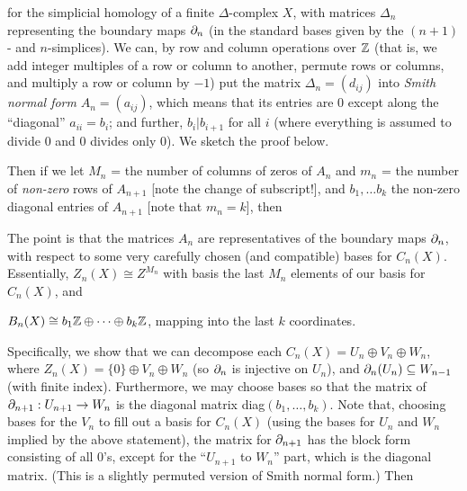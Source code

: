 \ssk

for the simplicial homology of a finite $\Delta$-complex $X$,
with matrices $\Delta_n$ representing the boundary maps $\partial_n$
(in the standard bases given by the $(n+1)$- and $n$-simplices).
We can, by row and column operations over ${\Bbb Z}$ (that is, we
add integer multiples of a row or column to another, permute
rows  or columns, and multiply a row or column by $-1$) put the
matrix $\Delta_n=(d_{ij})$ into {\it Smith normal form} 
$A_n=(a_{ij})$, which means that
its entries are $0$ except along the ``diagonal'' $a_{ii}=b_i$; and
further, $b_i|b_{i+1}$ for all $i$ (where everything is 
assumed to divide $0$ and $0$ divides only $0$). We sketch 
the proof below. 

\msk

Then if we let $M_n$ = the number of columns of zeros of $A_n$
and $m_n$ = the number of {\it non-zero} rows of $A_{n+1}$ 
[note the change of subscript!], and $b_1,\ldots b_k$ the non-zero
diagonal entries of $A_{n+1}$ [note that $m_n=k$], then

\ssk


\msk

The point is that the matrices $A_n$ are representatives of the 
boundary maps $\partial_n$, with respect to some very carefully chosen 
(and compatible) bases for $C_n(X)$. Essentially, $Z_n(X)\cong Z^{M_n}$ with
basis the last $M_n$ elements of our basis for $C_n(X)$, and 

$B_n(X)\cong b_1{\Bbb Z}\oplus\cdots\oplus b_k{\Bbb Z}$, mapping into
the last $k$ coordinates.

\vfill
\eject

Specifically, we show that we can decompose each
$C_n(X)=U_n\oplus V_n\oplus W_n$,  where $Z_n(X)=\{0\}\oplus V_n\oplus W_n$ 
(so $\partial_n$ is injective on $U_n$), and
$\partial_{n}(U_{n})\subseteq W_{n-1}$ (with finite index). 
Furthermore, we may choose bases
so that the matrix of $\partial_{n+1}:U_{n+1}\rightarrow W_{n}$ is the
diagonal matrix diag$(b_1,\ldots,b_k)$. Note that, choosing
bases for the $V_n$ to fill out a basis for $C_n(X)$ (using
the bases for $U_n$ and $W_n$ implied by the above statement),
the matrix for $\partial_{n+1}$ has the block form consisting
of all $0$'s, except for the ``$U_{n+1}$ to $W_n$'' part,
which is the diagonal matrix. (This is a slightly permuted version of
Smith normal form.)
Then

\ssk



